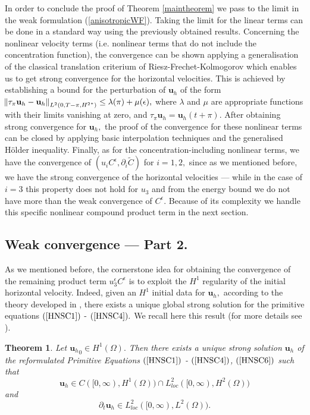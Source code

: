 \documentclass[11pt]{article}
\newtheorem{theorem}{Theorem}
\begin{document}
  In order to conclude the proof of Theorem \ref{maintheorem} we pass to the limit in the weak formulation (\ref{anisotropicWF}). Taking the limit for the linear terms can be done in a standard way using the previously obtained results.
   Concerning the nonlinear velocity terms (i.e. nonlinear terms that do not include the concentration function), the convergence can be shown applying a generalisation of the classical translation criterium of Riesz-Frechet-Kolmogorov which enables us to get strong convergence for the horizontal velocities. This is achieved by establishing a bound for the perturbation of $\mathbf{u}_h$ of the form $\norm{\tau_\pi \mathbf{u}_h - \mathbf{u}_h}_{L^2(0,T-\pi, {H^2}^*)} \leq \lambda(\pi) + \mu(\epsilon),$ where $\lambda$ and $\mu$ are appropriate functions with their limits vanishing at zero, and $\tau_\pi \mathbf{u}_h = \mathbf{u}_h (t+\pi) $. After obtaining strong convergence for $\mathbf{u}_h,$ the proof of the convergence for these nonlinear terms can be closed by applying basic interpolation techniques and the generalised H\"older inequality. 
  Finally, as for the concentration-including nonlinear terms, we have the convergence of $(u_i C^\epsilon, \partial_i \tilde{C})$ for $i=1,2,$ since as we mentioned before, we have the strong convergence of the horizontal velocities --- while in the case of $i=3$ this property does not hold for $u_3$ and from the energy bound we do not have more than the weak convergence of $C^\epsilon$. Because of its complexity we handle this specific nonlinear compound product term in the next section.
  
  \subsection{Weak convergence --- Part 2.}
  
  As we mentioned before, the cornerstone idea for obtaining the convergence of the remaining product term $u_3^\epsilon C^\epsilon$ is to exploit the $H^1$ regularity of the initial horizontal velocity. Indeed, given an $H^1$ initial data for $\mathbf{u}_h,$ according to the theory developed in \cite{cao2007global}, there exists a unique global strong solution for the primitive equations $(\ref{HNSC1})$ - $(\ref{HNSC4}).$ We recall here this result (for more details see \cite{cao2007global}).
  
  \begin{theorem} \label{PE3DWellPosedness}
    Let ${\mathbf{u}_h}_0 \in H^1(\Omega).$ Then there exists a unique strong solution $\mathbf{u}_h$ of the reformulated Primitive Equations $(\ref{HNSC1})$ - $(\ref{HNSC4})$, $(\ref{HNSC6})$ such that $$\mathbf{u}_h \in C([0, \infty), H^1(\Omega)) \cap L^2_{loc}([0, \infty), H^2(\Omega))$$ and $$\partial_t \mathbf{u}_h \in L^2_{loc} ([0,\infty), L^2(\Omega)).$$
  \end{theorem}
  
\end{document}
